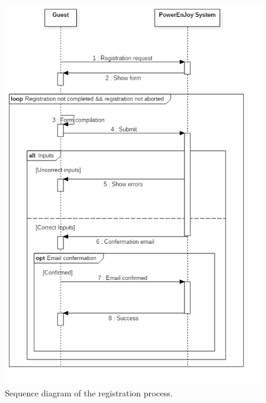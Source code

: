 \begin{figure}[H]
	\begin{center}
		\centering
		\includegraphics[height=0.9\textheight, keepaspectratio]{sequence_diagram/Registration.jpg}
		\caption{Sequence diagram of the registration process.}
	\end{center}
\end{figure}


